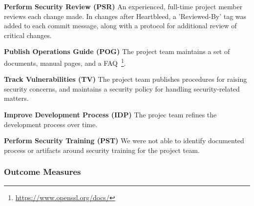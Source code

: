 \textbf{Perform Security Review (PSR)}
An experienced, full-time project member reviews each change made. In changes after Heartbleed, a 'Reviewed-By' tag was added to each commit message, along with a protocol for additional review of critical changes.

\textbf{Publish Operations Guide (POG)}
The project team maintains a set of documents, manual pages, and a FAQ~\footnote{\url{https://www.openssl.org/docs/}}.

\textbf{Track Vulnerabilities (TV)}
The project team publishes procedures for raising security concerns, and maintains a security policy for handling security-related matters. 

\textbf{Improve Development Process (IDP)}
The projec team refines the development process over time.

\textbf{Perform Security Training (PST)} 
We were not able to identify documented process or artifacts around security training for the project team.


%

\subsubsection{Outcome Measures}